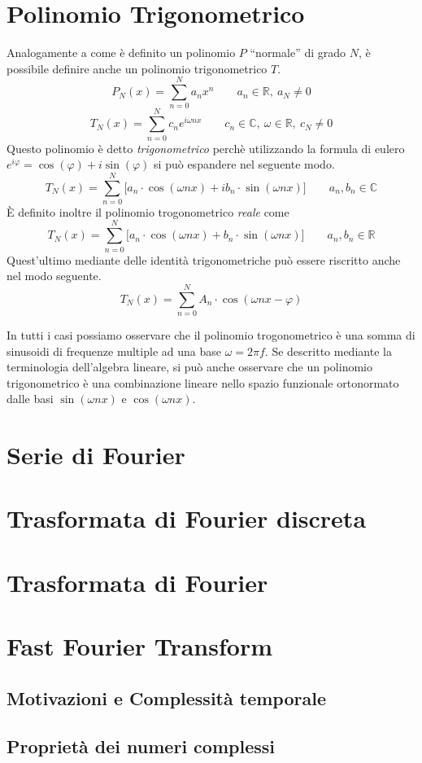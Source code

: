 \section{Polinomio Trigonometrico}
Analogamente a come \`e definito un polinomio \(P\) ``normale'' di grado
\(N\), \`e possibile definire anche un polinomio trigonometrico \(T\).
\[
    P_N(x) = \sum_{n=0}^N a_n x^n \qquad a_n \in \mathbb{R},~ a_N \neq 0
\]
\[
    T_N(x) = \sum_{n=0}^N c_n e^{i\omega nx} 
        \qquad c_n \in\mathbb{C},~\omega\in\mathbb{R}, ~ c_N \neq 0
\]
Questo polinomio \`e detto \emph{trigonometrico} perch\`e utilizzando la
formula di eulero \(e^{i\varphi} = \cos(\varphi) + i\sin(\varphi)\) si pu\`o
espandere nel seguente modo.
\[
    T_N(x) = \sum_{n=0}^N\big [a_n\cdot\cos(\omega nx) + ib_n\cdot\sin(\omega nx)]
    \qquad a_n, b_n \in \mathbb{C}
\]
\`E definito inoltre il polinomio trogonometrico \emph{reale} come
\[
    T_N(x) = \sum_{n=0}^N\big [a_n\cdot\cos(\omega nx) + b_n\cdot\sin(\omega nx)]
    \qquad a_n, b_n \in \mathbb{R}
\]
Quest'ultimo mediante delle identit\`a trigonometriche pu\`o essere riscritto
anche nel modo seguente.
\[
    T_N(x) = \sum_{n=0}^N A_n\cdot\cos(\omega nx - \varphi)
\]

In tutti i casi possiamo osservare che il polinomio trogonometrico \`e una
somma di sinusoidi di frequenze multiple ad una base \(\omega = 2\pi f\).
Se descritto mediante la terminologia dell'algebra lineare, si pu\`o anche
osservare che un polinomio trigonometrico \`e una combinazione lineare nello
spazio funzionale ortonormato dalle basi \(\sin(\omega nx)\) e \(\cos(\omega
nx)\).


\section{Serie di Fourier}

\section{Trasformata di Fourier discreta}

\section{Trasformata di Fourier}

\section{Fast Fourier Transform}
\subsection{Motivazioni e Complessit\`a temporale}
\subsection{Propriet\`a dei numeri complessi}


